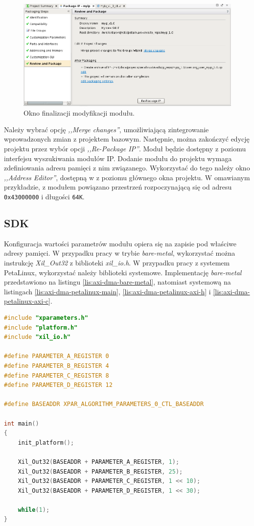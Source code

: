 \begin{figure}[ht]
	\centering
	\includegraphics[width=12cm]{img/vivado/axi-dma-review-package.png}
	\caption{Okno finalizacji modyfikacji modułu.}
	\label{fig:axi-dma-review-package}
\end{figure}

Należy wybrać opcję \emph{,,Merge changes''}, umożliwiającą zintegrowanie wprowadzonych zmian z projektem bazowym. 
Następnie, można zakończyć edycję projektu przez wybór opcji \emph{,,Re-Package IP''}. 
Moduł będzie dostępny z poziomu interfejsu wyszukiwania modułów IP.
Dodanie modułu do projektu wymaga zdefiniowania adresu pamięci z nim związanego. Wykorzystać do tego należy okno \emph{,,Address Editor''}, dostępną w z poziomu głównego okna projektu. W omawianym przykładzie, z modułem powiązano przestrzeń rozpoczynającą się od adresu \texttt{0x43000000} i długości \texttt{64K}.
\subsection{SDK}
\label{sec:vivado-axi-dma-sdk}

Konfiguracja wartości parametrów modułu opiera się na zapisie pod właściwe adresy pamięci. 
W przypadku pracy w trybie \textit{bare-metal}, wykorzystać można instrukcję \emph{Xil\_Out32} z biblioteki \emph{xil\_io.h}. 
W przypadku pracy z systemem PetaLinux, wykorzystać należy biblioteki systemowe. 
Implementację \textit{bare-metal} przedstawiono na listingu \ref{lis:axi-dma-bare-metal}, natomiast systemową na listingach \ref{lis:axi-dma-petalinux-main}, \ref{lis:axi-dma-petalinux-axi-h} i \ref{lis:axi-dma-petalinux-axi-c}.

\begin{lstlisting}[breaklines, language=C, label=lis:axi-dma-bare-metal, caption=Obsługa modułu w trybie bare-metal.]
#include "xparameters.h"
#include "platform.h"
#include "xil_io.h"

#define PARAMETER_A_REGISTER 0
#define PARAMETER_B_REGISTER 4
#define PARAMETER_C_REGISTER 8
#define PARAMETER_D_REGISTER 12

#define BASEADDR XPAR_ALGORITHM_PARAMETERS_0_CTL_BASEADDR

int main()
{
	init_platform();
	
	Xil_Out32(BASEADDR + PARAMETER_A_REGISTER, 1);
	Xil_Out32(BASEADDR + PARAMETER_B_REGISTER, 25);
	Xil_Out32(BASEADDR + PARAMETER_C_REGISTER, 1 << 10);
	Xil_Out32(BASEADDR + PARAMETER_D_REGISTER, 1 << 30);
	
	while(1);
}
\end{lstlisting}


